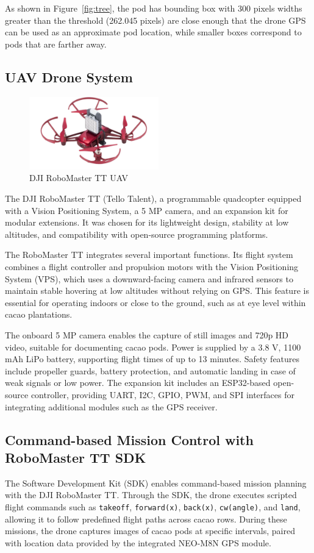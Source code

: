 As shown in Figure~\ref{fig:tree}, the pod has bounding box with 300 pixels widths greater than the threshold (262.045 pixels) are close enough that the drone GPS can be used as an approximate pod location, while smaller boxes correspond to pods that are farther away.

\subsection{UAV Drone System}

\begin{figure}[H]
	\centering
	\caption{DJI RoboMaster TT UAV}
	\label{fig:robomaster_tt}
	\includegraphics[width=0.5\textwidth]{figures/Robomaster_TT.pdf}
\end{figure}


The DJI RoboMaster TT (Tello Talent), a programmable quadcopter
equipped with a Vision Positioning System, a 5 MP camera, and an expansion kit for modular extensions.
It was chosen for its lightweight design, stability at low altitudes, and compatibility with open-source
programming platforms.

The RoboMaster TT integrates several important functions. Its flight system combines a flight controller and propulsion motors with the Vision Positioning System (VPS), which uses a downward-facing camera and infrared sensors to maintain stable hovering at low altitudes without relying on GPS. This feature is essential for operating indoors or close to the ground, such as at eye level within cacao plantations.

The onboard 5 MP camera enables the capture of still images and 720p HD video, suitable for documenting cacao pods. Power is supplied by a 3.8 V, 1100 mAh LiPo battery, supporting flight times of up to
13 minutes. Safety features include propeller guards, battery protection, and automatic landing in case of weak signals or low power. The expansion kit includes an ESP32-based open-source controller, providing UART, I2C, GPIO, PWM, and SPI interfaces for integrating additional modules such as the GPS receiver.

\subsection*{Command-based Mission Control with RoboMaster TT SDK}
The Software Development Kit (SDK) enables command-based mission planning with the DJI RoboMaster TT. Through the SDK, the drone executes scripted flight commands such as \texttt{takeoff}, \texttt{forward(x)}, \texttt{back(x)}, \texttt{cw(angle)}, and \texttt{land}, allowing it to follow predefined flight paths across cacao rows. During these missions, the drone captures images of cacao pods at specific intervals, paired with location data provided by the integrated NEO-M8N GPS module.

